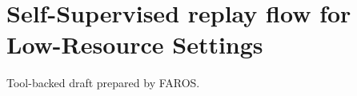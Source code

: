 \documentclass{article}
\begin{document}
\section*{Self-Supervised replay flow for Low-Resource Settings}
Tool-backed draft prepared by FAROS.
\end{document}
